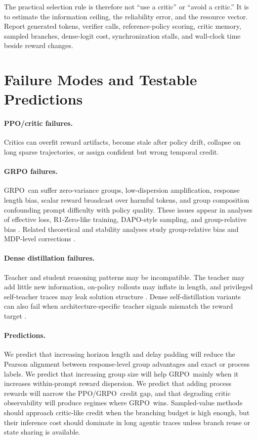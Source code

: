\documentclass[11pt]{article}
\newcommand{\grpo}{\textsc{GRPO}}
\newcommand{\ppo}{\textsc{PPO}}
\begin{document}
The practical selection rule is therefore not ``use a critic'' or ``avoid a
critic.'' It is to estimate the information ceiling, the reliability error, and
the resource vector. Report generated tokens, verifier calls, reference-policy
scoring, critic memory, sampled branches, dense-logit cost, synchronization
stalls, and wall-clock time beside reward changes.

\section{Failure Modes and Testable Predictions}

\paragraph{PPO/critic failures.}
Critics can overfit reward artifacts, become stale after policy drift, collapse
on long sparse trajectories, or assign confident but wrong temporal credit.

\paragraph{GRPO failures.}
\grpo\ can suffer zero-variance groups, low-dispersion amplification, response
length bias, scalar reward broadcast over harmful tokens, and group composition
confounding prompt difficulty with policy quality. These issues appear in
analyses of effective loss, R1-Zero-like training, DAPO-style sampling, and
group-relative bias
\citep{mroueh2025grpo,liu2025r1zero,yu2025dapo}. Related theoretical and
stability analyses study group-relative bias and MDP-level corrections
\citep{zhou2026grpo,yang2026groupbiased,salmani2026mdpgrpo}.

\paragraph{Dense distillation failures.}
Teacher and student reasoning patterns may be incompatible. The teacher may add
little new information, on-policy rollouts may inflate in length, and
privileged self-teacher traces may leak solution structure
\citep{li2026opd,luo2026opd}. Dense self-distillation variants can also fail
when architecture-specific teacher signals mismatch the reward target
\citep{zhao2026opsd,luo2026dopsd}.

\paragraph{Predictions.}
We predict that increasing horizon length and delay padding will reduce the
Pearson alignment between response-level group advantages and exact or process
labels. We predict that increasing group size will help \grpo\ mainly when it
increases within-prompt reward dispersion. We predict that adding process
rewards will narrow the \ppo/\grpo\ credit gap, and that degrading critic
observability will produce regimes where \grpo\ wins. Sampled-value methods should approach
critic-like credit when the branching budget is high enough, but their
inference cost should dominate in long agentic traces unless branch reuse or
state sharing is available.
\end{document}
